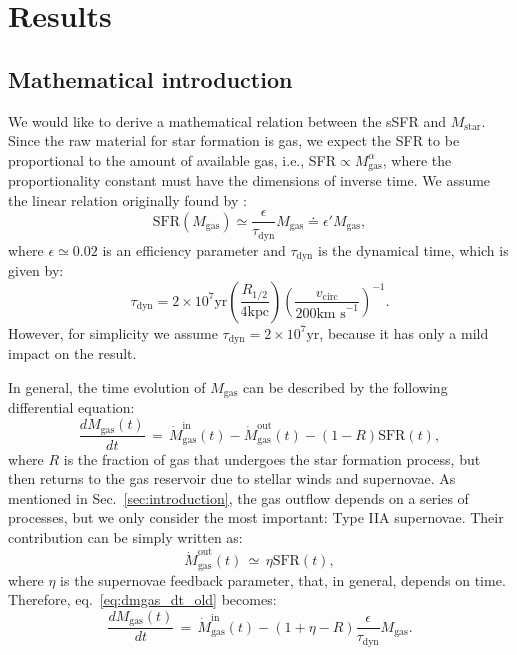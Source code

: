 \documentclass[fleqn,usenatbib]{mnras}
\begin{document}
\section{Results}\label{sec:results}
\subsection{Mathematical introduction}\label{sec:mathematical_introduction}
We would like to derive a mathematical relation between the sSFR and $M_\text{star}$. Since the raw material for star formation is gas, we expect the SFR to be proportional to the amount of available gas, i.e., SFR$\propto M_\text{gas}^\alpha$, where the proportionality constant must have the dimensions of inverse time. We assume the linear relation originally found by \citet{Kennicutt_1998}:
\begin{equation}
    \text{SFR}\left(M_\text{gas}\right) \simeq \dfrac{\epsilon}{\tau_\text{dyn}} M_\text{gas} \doteq \epsilon' M_\text{gas},
	\label{eq:SFR_vs_gasmas}
\end{equation}
where $\epsilon \simeq 0.02$ is an efficiency parameter and $\tau_\text{dyn}$ is the dynamical time, which is given by:
\begin{equation}
    \tau_\text{dyn} = 2 \times 10^7 \text{yr} \left(\dfrac{R_{1\slash2}}{4\text{kpc}}\right) \left(\dfrac{v_\text{circ}}{200\text{km s}^{-1}}\right)^{-1}.
	\label{eq:t_dynamical}
\end{equation}
However, for simplicity we assume $\tau_\text{dyn} = 2 \times 10^7 \text{yr}$, because it has only a mild impact on the result.

\smallskip
In general, the time evolution of $M_\text{gas}$ can be described by the following differential equation:
\begin{equation}
    \dfrac{dM_\text{gas}(t)}{dt} \, = \, \dot{M}_\text{gas}^\text{in}(t) - \dot{M}_\text{gas}^\text{out}(t) - \left(1-R\right)\text{SFR}(t),
	\label{eq:dmgas_dt_old}
\end{equation}
where $R$ is the fraction of gas that undergoes the star formation process, but then returns to the gas reservoir due to stellar winds and supernovae.
As mentioned in Sec.~\ref{sec:introduction}, the gas outflow depends on a series of processes, but we only consider the most important: Type IIA supernovae. Their contribution can be simply written as:
\begin{equation}
    \dot{M}_\text{gas}^\text{out}(t) \, \simeq \, \eta\text{SFR}(t),
	\label{eq:mgas_outflow}
\end{equation}
where $\eta$ is the supernovae feedback parameter, that, in general, depends on time. Therefore, eq.~\ref{eq:dmgas_dt_old} becomes:
\begin{equation}
    \dfrac{dM_\text{gas}(t)}{dt} \, = \, \dot{M}_\text{gas}^\text{in}(t) - \left(1+\eta-R\right) \dfrac{\epsilon}{\tau_\text{dyn}} M_\text{gas}.
	\label{eq:dmgas_dt}
\end{equation}
\end{document}
